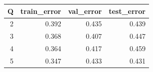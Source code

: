 \begin{tabular}{rrrr}
\toprule
Q & train_error & val_error & test_error \\
\midrule
2 & 0.392 & 0.435 & 0.439 \\
3 & 0.368 & 0.407 & 0.447 \\
4 & 0.364 & 0.417 & 0.459 \\
5 & 0.347 & 0.433 & 0.431 \\
\bottomrule
\end{tabular}

